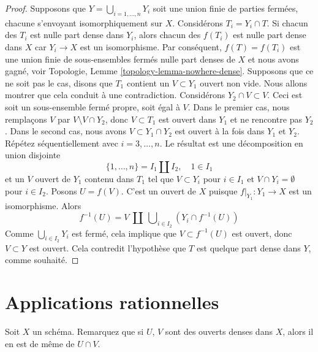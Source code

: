\begin{proof}
\medskip\noindent Supposons
que $Y = \bigcup_{i = 1, \ldots, n} Y_i$ soit une union finie de parties fermées, chacune s'envoyant
isomorphiquement sur $X$. Considérons $T_i = Y_i \cap T$. Si chacun
des $T_i$ est nulle part dense dans $Y_i$, alors chacun des $f(T_i)$
est nulle part dense dans $X$ car $Y_i \to X$ est un isomorphisme. Par conséquent,
$f(T) = f(T_i)$ est une union finie de sous-ensembles fermés nulle part
denses de $X$ et nous avons
gagné, voir Topologie, Lemme \ref{topology-lemma-nowhere-dense}. Supposons que ce ne
soit pas le cas, disons que $T_1$ contient un $V \subset Y_1$ ouvert non
vide. Nous allons montrer que cela conduit à une contradiction.
Considérons $Y_2 \cap V \subset V$. Ceci est soit un sous-ensemble
fermé propre, soit égal à $V$. Dans le premier cas, nous remplaçons
$V$ par $V \setminus V \cap Y_2$, donc $V \subset T_1$ est ouvert dans $Y_1$ et ne rencontre
pas $Y_2$. Dans le second cas, nous avons
$V \subset Y_1 \cap Y_2$ est ouvert à la fois dans $Y_1$ et $Y_2$.
Répétez séquentiellement avec $i = 3, \ldots, n$. Le résultat est une décomposition
en union disjointe
$$
\{1, \ldots, n\} = I_1 \amalg I_2, \quad 1 \in I_1
$$
et un $V$ ouvert de $Y_1$ contenu dans $T_1$ tel que
$V \subset Y_i$ pour $i \in I_1$ et $V \cap Y_i = \emptyset$ pour $i \in I_2$. Posons $U = f(V)$.
C'est un ouvert de $X$ puisque $f|_{Y_1} : Y_1 \to X$ est un
isomorphisme. Alors
$$
f^{-1}(U) = V\ \amalg\ \bigcup\nolimits_{i \in I_2} (Y_i \cap f^{-1}(U))
$$
Comme $\bigcup_{i \in I_2} Y_i$ est fermé, cela implique que $V \subset f^{-1}(U)$ est
ouvert, donc $V \subset Y$ est ouvert. Cela contredit l'hypothèse
que $T$ est quelque part dense dans $Y$, comme souhaité.
\end{proof}







\section{Applications rationnelles}
\label{section-rational-maps}

\noindent
Soit $X$ un schéma. Remarquez que si $U$, $V$ sont des ouverts denses dans $X$,
alors il en est de même de $U \cap V$.

